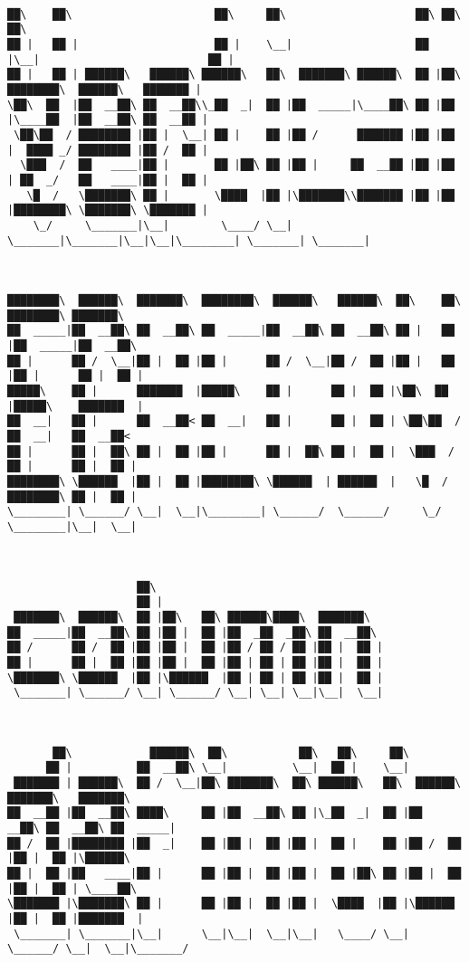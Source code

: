 \documentclass[varwidth=\maxdimen,margin=0.5cm,multi={verbatim}]{standalone}
\begin{document}
\begin{verbatim}

██\    ██\                      ██\     ██\                    ██\ ██\                           ██\
██ |   ██ |                     ██ |    \__|                   ██ |\__|                          ██ |
██ |   ██ | ██████\   ██████\ ██████\   ██\  ███████\ ██████\  ██ |██\ ████████\  ██████\   ███████ |
\██\  ██  |██  __██\ ██  __██\\_██  _|  ██ |██  _____|\____██\ ██ |██ |\____██  |██  __██\ ██  __██ |
 \██\██  / ████████ |██ |  \__| ██ |    ██ |██ /      ███████ |██ |██ |  ████ _/ ████████ |██ /  ██ |
  \███  /  ██   ____|██ |       ██ |██\ ██ |██ |     ██  __██ |██ |██ | ██  _/   ██   ____|██ |  ██ |
   \█  /   \███████\ ██ |       \████  |██ |\███████\\███████ |██ |██ |████████\ \███████\ \███████ |
    \_/     \_______|\__|        \____/ \__| \_______|\_______|\__|\__|\________| \_______| \_______|



████████\  ██████\  ███████\  ████████\  ██████\   ██████\  ██\    ██\ ████████\ ███████\
██  _____|██  __██\ ██  __██\ ██  _____|██  __██\ ██  __██\ ██ |   ██ |██  _____|██  __██\
██ |      ██ /  \__|██ |  ██ |██ |      ██ /  \__|██ /  ██ |██ |   ██ |██ |      ██ |  ██ |
█████\    ██ |      ███████  |█████\    ██ |      ██ |  ██ |\██\  ██  |█████\    ███████  |
██  __|   ██ |      ██  __██< ██  __|   ██ |      ██ |  ██ | \██\██  / ██  __|   ██  __██<
██ |      ██ |  ██\ ██ |  ██ |██ |      ██ |  ██\ ██ |  ██ |  \███  /  ██ |      ██ |  ██ |
████████\ \██████  |██ |  ██ |████████\ \██████  | ██████  |   \█  /   ████████\ ██ |  ██ |
\________| \______/ \__|  \__|\________| \______/  \______/     \_/    \________|\__|  \__|



                    ██\
                    ██ |
 ███████\  ██████\  ██ |██\   ██\ ██████\████\  ███████\
██  _____|██  __██\ ██ |██ |  ██ |██  _██  _██\ ██  __██\
██ /      ██ /  ██ |██ |██ |  ██ |██ / ██ / ██ |██ |  ██ |
██ |      ██ |  ██ |██ |██ |  ██ |██ | ██ | ██ |██ |  ██ |
\███████\ \██████  |██ |\██████  |██ | ██ | ██ |██ |  ██ |
 \_______| \______/ \__| \______/ \__| \__| \__|\__|  \__|



       ██\            ██████\  ██\           ██\   ██\     ██\
      ██ |          ██  __██\ \__|          \__|  ██ |    \__|
 ███████ | ██████\  ██ /  \__|██\ ███████\  ██\ ██████\   ██\  ██████\  ███████\   ███████\
██  __██ |██  __██\ ████\     ██ |██  __██\ ██ |\_██  _|  ██ |██  __██\ ██  __██\ ██  _____|
██ /  ██ |████████ |██  _|    ██ |██ |  ██ |██ |  ██ |    ██ |██ /  ██ |██ |  ██ |\██████\
██ |  ██ |██   ____|██ |      ██ |██ |  ██ |██ |  ██ |██\ ██ |██ |  ██ |██ |  ██ | \____██\
\███████ |\███████\ ██ |      ██ |██ |  ██ |██ |  \████  |██ |\██████  |██ |  ██ |███████  |
 \_______| \_______|\__|      \__|\__|  \__|\__|   \____/ \__| \______/ \__|  \__|\_______/





\end{verbatim}
\end{document}
